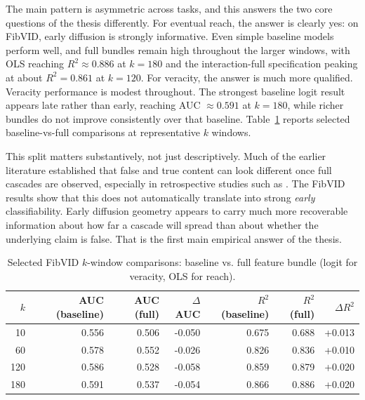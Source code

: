 The main pattern is asymmetric across tasks, and this answers the two core questions of the thesis differently. For eventual reach, the answer is clearly yes: on FibVID, early diffusion is strongly informative. Even simple baseline models perform well, and full bundles remain high throughout the larger windows, with OLS reaching $R^2 \approx 0.886$ at $k=180$ and the interaction-full specification peaking at about $R^2=0.861$ at $k=120$. For veracity, the answer is much more qualified. Veracity performance is modest throughout. The strongest baseline logit result appears late rather than early, reaching AUC $\approx 0.591$ at $k=180$, while richer bundles do not improve consistently over that baseline. Table~\ref{tab:k_main_selected} reports selected baseline-vs-full comparisons at representative $k$ windows.

This split matters substantively, not just descriptively. Much of the earlier literature established that false and true content can look different once full cascades are observed, especially in retrospective studies such as \citet{vosoughi_spread_2018}. The FibVID results show that this does not automatically translate into strong \emph{early} classifiability. Early diffusion geometry appears to carry much more recoverable information about how far a cascade will spread than about whether the underlying claim is false. That is the first main empirical answer of the thesis.

\begin{table}[htbp]
  \centering
  \caption{Selected FibVID $k$-window comparisons: baseline vs. full feature bundle (logit for veracity, OLS for reach).}
  \label{tab:k_main_selected}
  \begin{tabular}{rrrrrrr}
    \toprule
    $k$ & AUC (baseline) & AUC (full) & $\Delta$AUC & $R^2$ (baseline) & $R^2$ (full) & $\Delta R^2$ \\
    \midrule
    10  & 0.556 & 0.506 & -0.050 & 0.675 & 0.688 & +0.013 \\
    60  & 0.578 & 0.552 & -0.026 & 0.826 & 0.836 & +0.010 \\
    120 & 0.586 & 0.528 & -0.058 & 0.859 & 0.879 & +0.020 \\
    180 & 0.591 & 0.537 & -0.054 & 0.866 & 0.886 & +0.020 \\
    \bottomrule
  \end{tabular}
\end{table}


